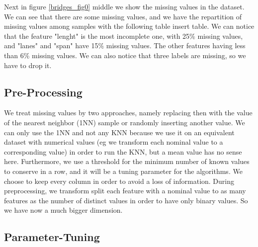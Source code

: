 \documentclass[11pt]{article}
\begin{document}
Next in figure \ref{bridges_fig0} middle we show the missing values in the dataset. We can see that there are some missing values, and we have the repartition of missing values among samples with the following table {insert table}. We can notice that the feature "lenght" is the most incomplete one, with 25\% missing values, and "lanes" and "span" have 15\% missing values. The other features having less than 6\% missing values. We can also notice that three labels are missing, so we have to drop it.

\subsection{Pre-Processing}

We treat missing values by two approaches, namely replacing then with the value of the nearest neighbor (1NN) sample or randomly inserting another value. We can only use the 1NN and not any KNN because we use it on an equivalent dataset with numerical values (eg we transform each nominal value to a corresponding value) in order to run the KNN, but a mean value has no sense here.
Furthermore, we use a threshold for the minimum number of known values to conserve in a row, and it will be a tuning parameter for the algorithms. We choose to keep every column in order to avoid a loss of information.
During preprocessing, we transform split each feature with a nominal value to as many features as the number of distinct values in order to have only binary values. So we have now a much bigger dimension.


\subsection{Parameter-Tuning}
\end{document}
